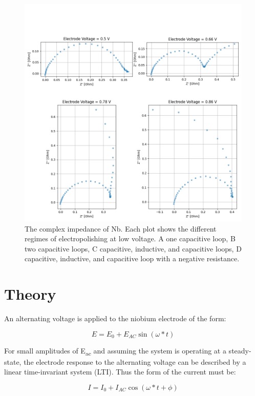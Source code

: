 \documentclass[11pt]{article}
\begin{document}
\begin{figure}
  \label{fig:nyquistplot}
  \includegraphics[]{figures/nyquist.png}
  \caption{The complex impedance of Nb. Each plot shows the different regimes of electropolishing at low voltage. A one capacitive loop, B two capacitive loops, C capacitive, inductive, and capacitive loops, D capacitive, inductive, and capacitive loop with a negative resistance.}
\end{figure}



\section{Theory}
\label{sec:org7d749e2}
An alternating voltage is applied to the niobium electrode of the form:

\begin{equation}
E=E_{0}+E_{AC}\sin(\omega*t)
\end{equation}

For small amplitudes of E\textsubscript{ac}  and assuming the system is operating at a steady-state, the electrode response to the alternating voltage can be described by a linear time-invariant system (LTI). Thus the form of the current must be:

\begin{equation}
I=I_{0}+I_{AC}\cos(\omega*t+\phi)
\end{equation}
\end{document}
